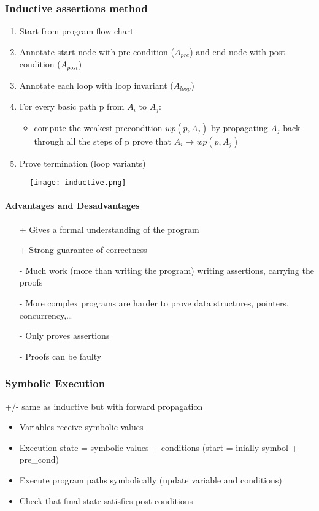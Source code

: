 \subsubsection{Inductive assertions method}
\begin{enumerate}
	\item Start from program flow chart
    \item Annotate start node with pre-condition ($A_{pre}$) and end node
        with post condition ($A_{post}$)
    \item Annotate each loop with loop invariant ($A_{loop}$)
	\item For every basic path p from $A_i$ to $A_j$:
	\begin{itemize}
		\item compute the weakest precondition $wp(p,A_j)$ by propagating $A_j$
		back through all the steps of p prove that $A_i \rightarrow wp(p,A_j)$
	\end{itemize}
\item Prove termination (loop variants)
\end{enumerate}

\begin{figure}[!ht]
    \centering
    \texttt{[image: inductive.png]}
\end{figure}

\paragraph{Advantages and Desadvantages}
\begin{itemize}
    \item[+] Gives a formal understanding of the program
    \item[+] Strong guarantee of correctness
    \item[-] Much work (more than writing the program) writing assertions, carrying the proofs
    \item[-] More complex programs are harder to prove data structures, pointers, concurrency,\ldots
    \item[-] Only proves assertions
    \item[-] Proofs can be faulty
\end{itemize}

\subsubsection{Symbolic Execution}
+/- same as inductive but with forward propagation
\begin{itemize}
	\item Variables receive symbolic values
	\item Execution state = symbolic values + conditions (start = inially symbol + pre\_cond)
	\item Execute program paths symbolically (update variable and conditions)
	\item Check that final state satisfies post-conditions
\end{itemize}

